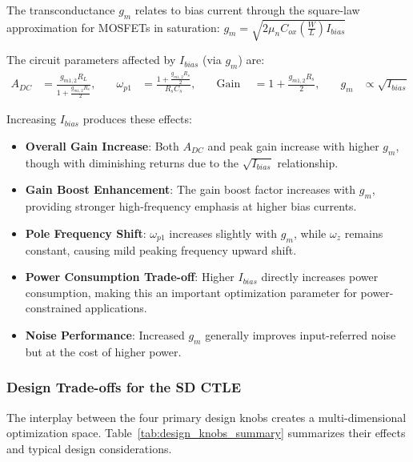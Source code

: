 The transconductance $g_m$ relates to bias current through the square-law approximation for MOSFETs in saturation: $g_m = \sqrt{2\mu_n C_{ox} \left(\frac{W}{L}\right) I_{bias}}$

The circuit parameters affected by $I_{bias}$ (via $g_m$) are:
\[
\begin{aligned}
A_{DC} &= \frac{g_{m1,2}R_L}{1 + \frac{g_{m1,2}R_s}{2}}, &\quad
\omega_{p1} &= \frac{1 + \frac{g_{m1,2} R_s}{2}}{R_s C_s}, &\quad
\text{Gain Boost} &= 1 + \frac{g_{m1,2} R_s}{2}, &\quad
g_m &\propto \sqrt{I_{bias}}
\end{aligned}
\]

Increasing $I_{bias}$ produces these effects:

\begin{itemize}
    \item \textbf{Overall Gain Increase}: Both $A_{DC}$ and peak gain increase with higher $g_m$, though with diminishing returns due to the $\sqrt{I_{bias}}$ relationship.
    \item \textbf{Gain Boost Enhancement}: The gain boost factor increases with $g_m$, providing stronger high-frequency emphasis at higher bias currents.
    \item \textbf{Pole Frequency Shift}: $\omega_{p1}$ increases slightly with $g_m$, while $\omega_z$ remains constant, causing mild peaking frequency upward shift.
    \item \textbf{Power Consumption Trade-off}: Higher $I_{bias}$ directly increases power consumption, making this an important optimization parameter for power-constrained applications.
    \item \textbf{Noise Performance}: Increased $g_m$ generally improves input-referred noise but at the cost of higher power.
\end{itemize}


\subsubsection*{Design Trade-offs for the SD CTLE}
\label{subsec:design_tradeoffs}

The interplay between the four primary design knobs creates a multi-dimensional optimization space. Table~\ref{tab:design_knobs_summary} summarizes their effects and typical design considerations.

